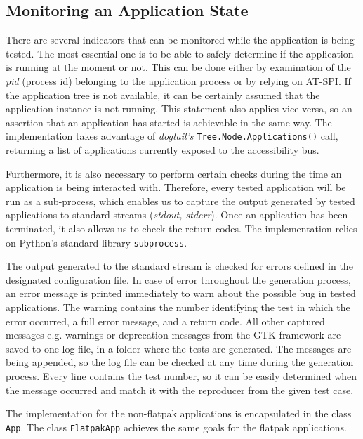 \subsection{Monitoring an Application State}
There are several indicators that can be monitored while the application is being tested. The most essential one is to be able to safely determine if the application is running at the moment or not. This can be done either by examination of the \textit{pid} (process id) belonging to the application process or by relying on AT-SPI. If the application tree is not available, it can be certainly assumed that the application instance is not running. This statement also applies vice versa, so an assertion that an application has started is achievable in the same way. The implementation takes advantage of \textit{dogtail's} \texttt{Tree.Node.Applications()} call, returning a list of applications currently exposed to the accessibility bus.

Furthermore, it is also necessary to perform certain checks during the time an application is being interacted with. Therefore, every tested application will be run as a sub-process, which enables us to capture the output generated by tested applications to standard streams (\textit{stdout, stderr}). Once an application has been terminated, it also allows us to check the return codes. The implementation relies on Python's standard library \texttt{subprocess}. 

The output generated to the standard stream is checked for errors defined in the designated configuration file. In case of error throughout the generation process, an error message is printed immediately to warn about the possible bug in tested applications. The warning contains the number identifying the test in which the error occurred, a full error message, and a return code. All other captured messages e.g. warnings or deprecation messages from the GTK framework are saved to one log file, in a folder where the tests are generated. The messages are being appended, so the log file can be checked at any time during the generation process. Every line contains the test number, so it can be easily determined when the message occurred and match it with the reproducer from the given test case.

The implementation for the non-flatpak applications is encapsulated in the class \texttt{App}. The class \texttt{FlatpakApp} achieves the same goals for the flatpak applications.

